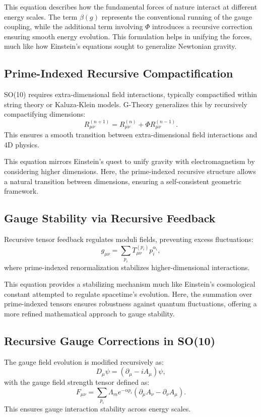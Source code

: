 \documentclass{article}
\theoremstyle{plain}
\begin{document}
This equation describes how the fundamental forces of nature interact at different energy scales. The term $\beta(g)$ represents the conventional running of the gauge coupling, while the additional term involving $\Phi$ introduces a recursive correction ensuring smooth energy evolution. This formulation helps in unifying the forces, much like how Einstein's equations sought to generalize Newtonian gravity.

\subsection{Prime-Indexed Recursive Compactification}
SO(10) requires extra-dimensional field interactions, typically compactified within string theory or Kaluza-Klein models. G-Theory generalizes this by recursively compactifying dimensions:
\begin{equation}
    R_{\mu\nu}^{(n+1)} = R_{\mu\nu}^{(n)} + \Phi R_{\mu\nu}^{(n-1)}.
\end{equation}
This ensures a smooth transition between extra-dimensional field interactions and 4D physics.

This equation mirrors Einstein’s quest to unify gravity with electromagnetism by considering higher dimensions. Here, the prime-indexed recursive structure allows a natural transition between dimensions, ensuring a self-consistent geometric framework.

\subsection{Gauge Stability via Recursive Feedback}
Recursive tensor feedback regulates moduli fields, preventing excess fluctuations:
\begin{equation}
    g_{\mu\nu} = \sum_{p_i} T_{\mu\nu}^{(p_i)} p_i^{\alpha_i},
\end{equation}
where prime-indexed renormalization stabilizes higher-dimensional interactions.

This equation provides a stabilizing mechanism much like Einstein’s cosmological constant attempted to regulate spacetime’s evolution. Here, the summation over prime-indexed tensors ensures robustness against quantum fluctuations, offering a more refined mathematical approach to gauge stability.

\subsection{Recursive Gauge Corrections in SO(10)}
The gauge field evolution is modified recursively as:
\begin{equation}
    D_{\mu} \psi = (\partial_{\mu} - i A_{\mu}) \psi,
\end{equation}
with the gauge field strength tensor defined as:
\begin{equation}
    F_{\mu\nu} = \sum_{p_i} \Lambda_m e^{-\alpha p_i} (\partial_{\mu} A_{\nu} - \partial_{\nu} A_{\mu}).
\end{equation}
This ensures gauge interaction stability across energy scales.
\end{document}
